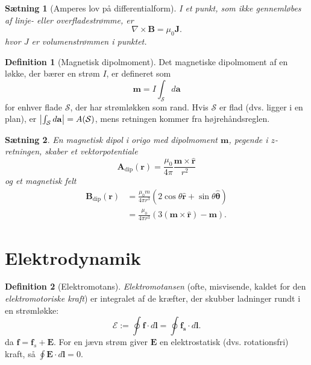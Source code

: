 \documentclass[]{article}
\newcommand{\hr}{\hat{\mathbf{r}}}
\newcommand{\hth}{\hat{\bm{\theta}}}
\newtheorem{theorem}{Sætning}
\theoremstyle{definition}
\newtheorem{definition}{Definition}
\begin{document}
\begin{theorem}[Amperes lov på differentialform]
	I et punkt, som ikke gennemløbes af linje- eller overfladestrømme, er
	\begin{equation*}
		\nabla \times \mathbf{B} = \mu_0 \mathbf{J}.
	\end{equation*}
	hvor $J$ er volumenstrømmen i punktet.
\end{theorem}

\begin{definition}[Magnetisk dipolmoment]
	Det magnetiske dipolmoment af en løkke, der bærer en strøm $I$, er defineret som
	\begin{equation*}
		\mathbf{m} = I \int_\mathcal{S}{d\mathbf{a}}
	\end{equation*}
	for enhver flade $\mathcal{S}$, der har strømløkken som rand. Hvis $\mathcal{S}$ er flad (dvs. ligger i en plan), er $\abs{\int_\mathcal{S}{d\mathbf{a}}} = A(\mathcal{S})$, mens retningen kommer fra højrehåndsreglen.
\end{definition}

\begin{theorem}
	En magnetisk dipol i origo med dipolmoment $\mathbf{m}$, pegende i $z$-retningen, skaber et vektorpotentiale
	\begin{equation*}
		\mathbf{A}_\text{dip}(\mathbf{r}) = \frac{\mu_0}{4\pi} \frac{\mathbf{m} \times \hat {\mathbf{r}}}{r^2}
	\end{equation*}
	og et magnetisk felt
	\begin{align*}
		\mathbf{B}_\text{dip}(\mathbf{r}) &= \frac{\mu_0m}{4\pi r^3}(2 \cos \theta \hr + \sin \theta \hth)\\
		&= \frac{\mu_0}{4\pi r^3}(3(\mathbf{m}\times \hr) - \mathbf{m}).
	\end{align*}
\end{theorem}

\section{Elektrodynamik}

\begin{definition}[Elektromotans]
	\emph{Elektromotansen} (ofte, misvisende, kaldet for den \emph{elektromotoriske kraft}) er integralet af de kræfter, der skubber ladninger rundt i en strømløkke:
	\begin{equation*}
		\mathcal{E} := \oint \mathbf{f} \cdot d\mathbf{l} = \oint \mathbf{f_s} \cdot d\mathbf{l}.
	\end{equation*}
	da $\mathbf{f} = \mathbf{f}_s + \mathbf{E}$. For en jævn strøm giver $\mathbf{E}$ en elektrostatisk (dvs. rotationsfri) kraft, så  $\oint \mathbf{E} \cdot d\mathbf{l} = 0$.
\end{definition}
\end{document}
